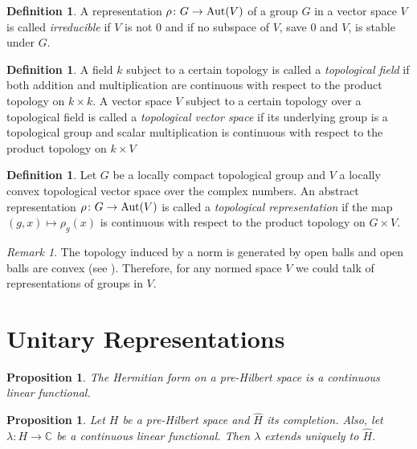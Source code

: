 \documentclass[12pt]{article}
\newtheorem{prop}[theorem]{Proposition}
\theoremstyle{definition}
\newtheorem{dfn}[theorem]{Definition}
\theoremstyle{remark}
\newtheorem{rem}[theorem]{Remark}
\begin{document}
    \begin{dfn}
        A representation $\rho\colon G \to \textup{Aut}(V)$ of a group $G$ in a vector space $V$ is called \emph{irreducible} if $V$ is not $0$ and if no subspace of $V$, save $0$ and $V$, is stable under $G$.
    \end{dfn}

    \begin{dfn}
        A field $k$ subject to a certain topology is called a \emph{topological field} if both addition and multiplication are continuous with respect to the product topology on $k\times k$. A vector space $V$ subject to a certain topology over a topological field is called a \emph{topological vector space} if its underlying group is a topological group and scalar multiplication is continuous with respect to the product topology on $k \times V$
    \end{dfn}

    \begin{dfn}
        Let $G$ be a locally compact topological group and $V$ a locally convex topological vector space over the complex numbers. An abstract representation $\rho\colon G\to\textup{Aut}(V)$ is called a \emph{topological representation} if the map $(g,x)\mapsto\rho_g(x)$ is continuous with respect to the product topology on $G\times V$.
    \end{dfn}

    \begin{rem}
        The topology induced by a norm is generated by open balls and open balls are convex (see \cite[Ch. IV, \S 1]{Conway1985}). Therefore, for any normed space $V$ we could talk of representations of groups in $V$.
    \end{rem}

    \section{Unitary Representations}

    \begin{prop}
        The Hermitian form on a pre-Hilbert space is a continuous linear functional.
    \end{prop}

    \begin{prop}
        Let $H$ be a pre-Hilbert space and $\hat H$ its completion. Also, let $\lambda\colon H\to\mathbb{C}$ be a continuous linear functional. Then $\lambda$ extends uniquely to $\hat H$.
    \end{prop}
\end{document}
